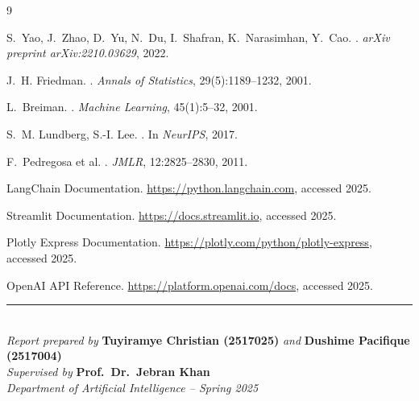 \documentclass[11pt,a4paper]{article}
\begin{document}
\begin{thebibliography}{9}

S.~Yao, J.~Zhao, D.~Yu, N.~Du, I.~Shafran, K.~Narasimhan, Y.~Cao.
.
\newblock \emph{arXiv preprint arXiv:2210.03629}, 2022.

J.~H. Friedman.
.
\newblock \emph{Annals of Statistics}, 29(5):1189--1232, 2001.

L.~Breiman.
.
\newblock \emph{Machine Learning}, 45(1):5--32, 2001.

S.~M. Lundberg, S.-I. Lee.
.
\newblock In \emph{NeurIPS}, 2017.

F.~Pedregosa et al.
.
\newblock \emph{JMLR}, 12:2825--2830, 2011.

LangChain Documentation. \url{https://python.langchain.com}, accessed 2025.

Streamlit Documentation. \url{https://docs.streamlit.io}, accessed 2025.

Plotly Express Documentation. \url{https://plotly.com/python/plotly-express}, accessed 2025.

OpenAI API Reference. \url{https://platform.openai.com/docs}, accessed 2025.

\end{thebibliography}

\vspace{1.0cm}
\begin{center}
\rule{0.7\textwidth}{0.4pt}\\[6pt]
\textit{Report prepared by} \textbf{Tuyiramye Christian (2517025)}
\textit{and} \textbf{Dushime Pacifique (2517004)}\\
\textit{Supervised by} \textbf{Prof.\ Dr.\ Jebran Khan}\\
\textit{Department of Artificial Intelligence -- Spring 2025}
\end{center}
\end{document}
